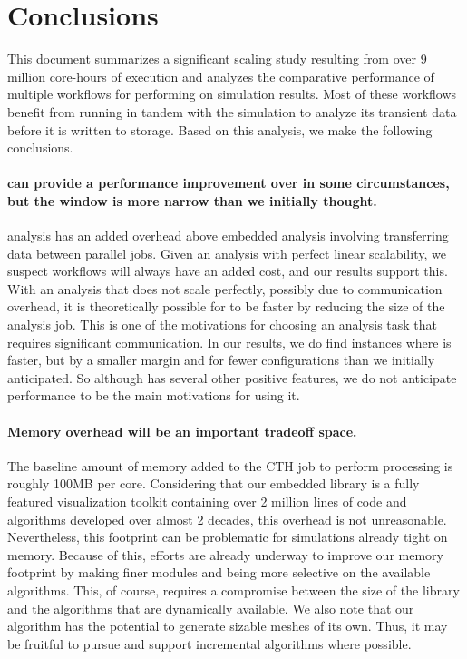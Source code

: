 \section{Conclusions}
\label{sec:Conclusion}

This document summarizes a significant scaling study resulting from over 9
million core-hours of execution and analyzes the comparative performance of
multiple workflows for performing \vda on simulation results.  Most of
these workflows benefit from running in tandem with the simulation to
analyze its transient data before it is written to storage.  Based on this
analysis, we make the following conclusions.

\paragraph{\Intransit can provide a performance improvement over \insitu in
  some circumstances, but the window is more narrow than we initially
  thought.}  \Intransit analysis has an added overhead above embedded
\insitu analysis involving transferring data between parallel jobs.  Given
an analysis with perfect linear scalability, we suspect \intransit
workflows will always have an added cost, and our results support this.
With an analysis that does not scale perfectly, possibly due to
communication overhead, it is theoretically possible for \intransit to be
faster by reducing the size of the analysis job.  This is one of the
motivations for choosing an analysis task that requires significant
communication.  In our results, we do find instances where \intransit is
faster, but by a smaller margin and for fewer configurations than we
initially anticipated.  So although \intransit has several other positive
features, we do not anticipate performance to be the main motivations for
using it.

\paragraph{Memory overhead will be an important tradeoff space.}
The baseline amount of memory added to the CTH job to perform \insitu
processing is roughly 100MB per core.  Considering that our embedded
\insitu library is a fully featured visualization toolkit containing over 2
million lines of code and algorithms developed over almost 2 decades, this
overhead is not unreasonable.  Nevertheless, this footprint can be
problematic for simulations already tight on memory.  Because of this,
efforts are already underway to improve our memory footprint by making
finer modules and being more selective on the available algorithms.  This,
of course, requires a compromise between the size of the library and the
algorithms that are dynamically available.  We also note that our algorithm
has the potential to generate sizable meshes of its own.  Thus, it may be
fruitful to pursue and support incremental algorithms where possible.

